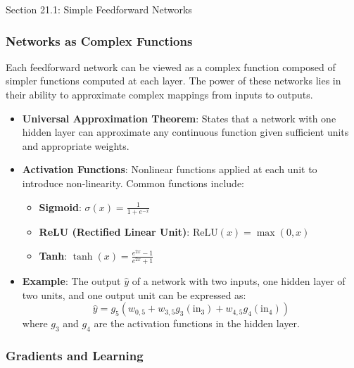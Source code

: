\begin{notes}{Section 21.1: Simple Feedforward Networks}
\begin{highlight}
    \end{highlight}
    
    \subsubsection*{Networks as Complex Functions}
    
    Each feedforward network can be viewed as a complex function composed of simpler functions computed at each layer. The power of these networks lies in their ability to approximate complex mappings 
    from inputs to outputs.
    
    \begin{highlight}
    
        \begin{itemize}
            \item \textbf{Universal Approximation Theorem}: States that a network with one hidden layer can approximate any continuous function given sufficient units and appropriate weights.
            \item \textbf{Activation Functions}: Nonlinear functions applied at each unit to introduce non-linearity. Common functions include:
            \begin{itemize}
                \item \textbf{Sigmoid}: $\sigma(x) = \frac{1}{1 + e^{-x}}$
                \item \textbf{ReLU (Rectified Linear Unit)}: $\text{ReLU}(x) = \max(0, x)$
                \item \textbf{Tanh}: $\tanh(x) = \frac{e^{2x} - 1}{e^{2x} + 1}$
            \end{itemize}
            \item \textbf{Example}: The output $\hat{y}$ of a network with two inputs, one hidden layer of two units, and one output unit can be expressed as:
            \[
            \hat{y} = g_5(w_{0,5} + w_{3,5}g_3(\text{in}_3) + w_{4,5}g_4(\text{in}_4))
            \]
            where $g_3$ and $g_4$ are the activation functions in the hidden layer.
        \end{itemize}
    
    \end{highlight}
    
    \subsubsection*{Gradients and Learning}
    

\end{notes}
